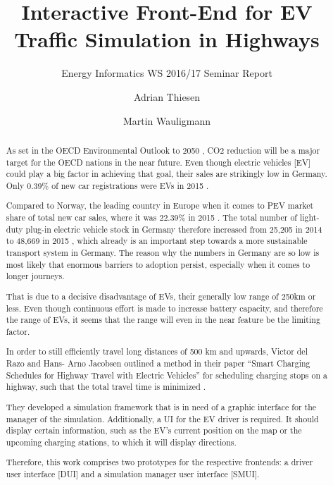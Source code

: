 \documentclass[sigconf]{acmart}
\begin{document}
\title{Interactive Front-End for EV Traffic Simulation in Highways}
\subtitle{Energy Informatics WS 2016/17 Seminar Report}

\author{Adrian Thiesen}
\vspace{2cm}

\author{Martin Wauligmann}
\vspace{2cm}


\begin{abstract}
As set in the OECD Environmental Outlook to 2050 \cite{1}, CO2 reduction will be a major target for the OECD nations in the near future. Even though electric vehicles [EV] could play a big factor in achieving that goal, their sales are strikingly low in Germany. Only 0.39\% of new car registrations were EVs in 2015 \cite{2}. 

Compared to Norway, the leading country in Europe when it comes to PEV market share of total new car sales, where it was 22.39\% in 2015 \cite{abstract-3}. The total number of light-duty plug-in electric vehicle stock in Germany therefore increased from 25,205 \cite{abstract-1} in 2014 to 48,669 in 2015 \cite{abstract-2}, which already is an important step towards a more sustainable transport system in Germany. The reason why the numbers in Germany are so low is most likely that enormous barriers to adoption persist, especially when it comes to longer journeys.

That is due to a decisive disadvantage of EVs, their generally low range of 250km or less. Even though continuous effort is made to increase battery capacity, and therefore the range of EVs, it seems that the range will even in the near feature be the limiting factor.

In order to still efficiently travel long distances of 500 km and upwards, Victor del Razo and Hans- Arno Jacobsen outlined a method in their paper ``Smart Charging Schedules for Highway Travel with Electric Vehicles'' for scheduling charging stops on a highway, such that the total travel time is minimized \cite{driver-17}.

They developed a simulation framework that is in need of a graphic interface for the manager of the simulation. Additionally, a UI for the EV driver is required. It should display certain information, such as the EV's current position on the map or the upcoming charging stations, to which it will display directions.

Therefore, this work comprises two prototypes for the respective frontends: a driver user interface [DUI] and a simulation manager user interface [SMUI]. 
\end{abstract}
\end{document}
